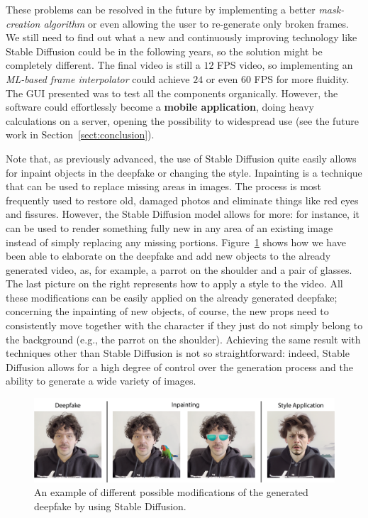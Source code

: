 \documentclass[sn-mathphys,Numbered]{sn-jnl}
\theoremstyle{thmstyleone}%
\theoremstyle{thmstyletwo}%
\theoremstyle{thmstylethree}%
\begin{document}
These problems can be resolved in the future by implementing a better \emph{mask-creation algorithm} or even allowing the user to re-generate only broken frames. We still need to find out what a new and continuously improving technology like Stable Diffusion could be in the following years, so the solution might be completely different. The final video is still a $12$ FPS video, so implementing an \emph{ML-based frame interpolator} could achieve  $24$ or even $60$ FPS for more fluidity.  The GUI presented was to test all the components organically. However, the software could effortlessly become a \textbf{mobile application}, doing heavy calculations on a server, opening the possibility to widespread use (see the future work in Section~\ref{sect:conclusion}).

Note that, as previously advanced, the use of Stable Diffusion quite easily allows for inpaint objects in the deepfake or changing the style. Inpainting is a technique that can be used to replace missing areas in images. The process is most frequently used to restore old, damaged photos and eliminate things like red eyes and fissures. However, the Stable Diffusion model allows for more: for instance, it can be used to render something fully new in any area of an existing image instead of simply replacing any missing portions. Figure~\ref{fig:options} shows how we have been able to elaborate on the deepfake and add new objects to the already generated video, as, for example, a parrot on the shoulder and a pair of glasses. The last picture on the right represents how to apply a style to the video. All these modifications can be easily applied on the already generated deepfake; concerning the inpainting of new objects, of course, the new props need to consistently move together with the character if they just do not simply belong to the background (e.g., the parrot on the shoulder). Achieving the same result with techniques other than Stable Diffusion is not so straightforward: indeed, Stable Diffusion allows for a high degree of control over the generation process and the ability to generate a wide variety of images.

\begin{figure}
	\centering
	\includegraphics[scale=0.8, keepaspectratio]{img/project_img/FinalDemo.png}
	\caption{An example of different possible modifications of the generated  deepfake by using Stable Diffusion.}\label{fig:options}
\end{figure}
\end{document}

